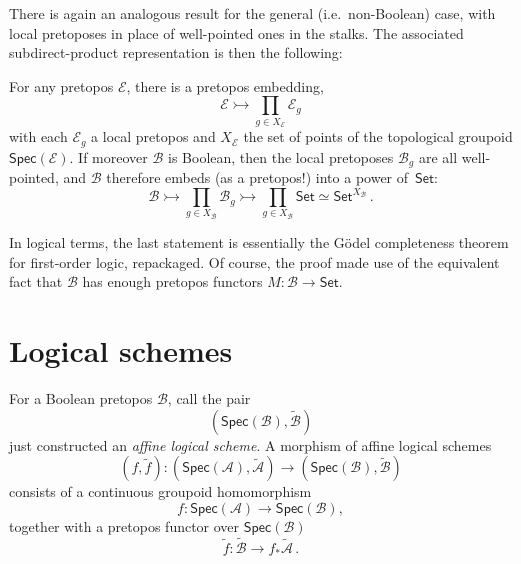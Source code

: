 \documentclass[graybox]{svmult}
\newcommand{\EE}{\ensuremath{\mathcal{E}}}
\newcommand{\BB}{\ensuremath{\mathcal{B}}}
\newcommand{\Set}{\ensuremath{\mathsf{Set}}}
\begin{document}
There is again an analogous result for the general (i.e.\ non-Boolean) case, with local pretoposes in place of well-pointed ones in the stalks.  The associated subdirect-product representation is then the following:

\begin{corollary}\label{bptsdp}
For any pretopos $\EE$, there is a pretopos embedding,
\[
\mathcal{E}\rightarrowtail \prod_{g\in X_\EE}\mathcal{E}_{g} 
\]
with each $\EE_g$ a local pretopos and $X_\EE$ the set of points of the topological groupoid $\mathsf{Spec}(\mathcal{E})$.
If moreover $\BB$ is Boolean, then the local pretoposes $\mathcal{B}_{g}$ are all well-pointed, and  $\BB$ therefore embeds (as a pretopos!) into a power of~$\Set$: 
\[
\mathcal{B}\rightarrowtail \prod_{g\in X_\BB}\mathcal{B}_{g} 
\rightarrowtail \prod_{g\in X_\BB}\Set \simeq \Set^{X_\BB}\,.
\]


\end{corollary}
In logical terms, the last statement is essentially the G\"odel completeness theorem for first-order logic, repackaged.  Of course, the proof made use of the equivalent fact that $\BB$ has enough pretopos functors $M:\BB\to\Set$. 

%
%

\section{Logical schemes}

For a Boolean pretopos $\BB$, call the pair $$(\mathsf{Spec}(\mathcal{B}), \widetilde{\mathcal{B}})$$ just constructed an \emph{affine logical scheme}.
A morphism of affine logical schemes
\[
(f, \widetilde{f}) : (\mathsf{Spec}(\mathcal{A}), \widetilde{\mathcal{A}}) \to (\mathsf{Spec}(\mathcal{B}), \widetilde{\mathcal{B}})
\]
consists of a continuous groupoid homomorphism 
\[
f : \mathsf{Spec}(\mathcal{A}) \to \mathsf{Spec}(\mathcal{B}),
\]
together with a pretopos functor over $\mathsf{Spec}(\mathcal{B})$
\[
\widetilde{f} : \widetilde{\mathcal{B}} \to f_*\widetilde{\mathcal{A}}\,.
\]
\end{document}
